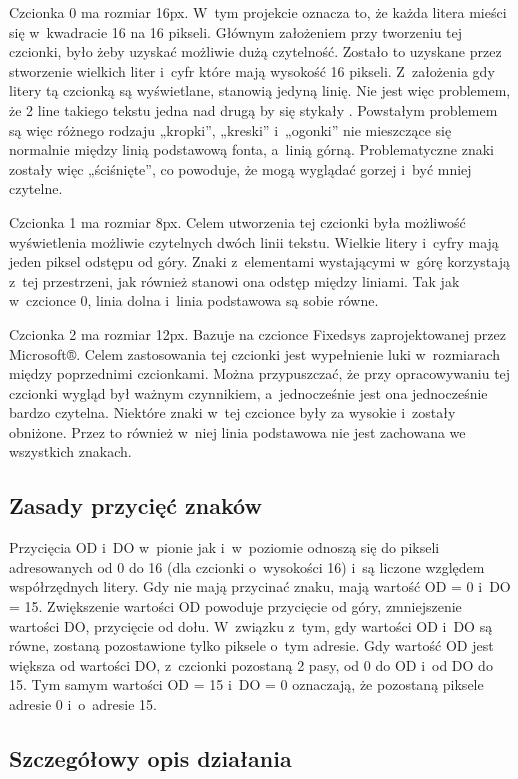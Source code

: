 Czcionka 0 ma rozmiar 16px. W~tym projekcie oznacza to, że każda litera mieści się w~kwadracie 16 na 16 pikseli. Głównym założeniem przy tworzeniu tej czcionki, było żeby uzyskać możliwie dużą czytelność. Zostało to uzyskane przez stworzenie wielkich liter i~cyfr które mają wysokość 16 pikseli. Z~założenia gdy litery tą czcionką są wyświetlane, stanowią jedyną linię. Nie jest więc problemem, że 2 line takiego tekstu jedna nad drugą by się stykały . Powstałym problemem są więc różnego rodzaju „kropki”, „kreski” i~„ogonki” nie mieszczące się normalnie między linią podstawową fonta, a~linią górną. Problematyczne znaki zostały więc „ściśnięte”, co powoduje, że mogą wyglądać gorzej i~być mniej czytelne. 

Czcionka 1 ma rozmiar 8px. Celem utworzenia tej czcionki była możliwość wyświetlenia możliwie czytelnych dwóch linii tekstu. Wielkie litery i~cyfry mają jeden piksel odstępu od góry. Znaki z~elementami wystającymi w~górę korzystają z~tej przestrzeni, jak również stanowi ona odstęp między liniami. Tak jak w~czcionce 0, linia dolna i~linia podstawowa są sobie równe.

Czcionka 2 ma rozmiar 12px. Bazuje na czcionce Fixedsys zaprojektowanej przez Microsoft®. Celem zastosowania tej czcionki jest wypełnienie luki w~rozmiarach między poprzednimi czcionkami. Można przypuszczać, że przy opracowywaniu tej czcionki wygląd był ważnym czynnikiem, a~jednocześnie jest ona jednocześnie bardzo czytelna. Niektóre znaki w~tej czcionce były za wysokie i~zostały obniżone. Przez to również w~niej linia podstawowa nie jest zachowana we wszystkich znakach.

\subsection{Zasady przycięć znaków}
Przycięcia OD i~DO w~pionie jak i~w~poziomie odnoszą się do pikseli adresowanych od 0 do 16 (dla czcionki o~wysokości 16) i~są liczone względem współrzędnych litery. Gdy nie mają przycinać znaku, mają wartość OD = 0 i~DO = 15. Zwiększenie wartości OD powoduje przycięcie od góry, zmniejszenie wartości DO, przycięcie od dołu. W~związku z~tym, gdy wartości OD i~DO są równe, zostaną pozostawione tylko piksele o~tym adresie. Gdy wartość OD jest większa od wartości DO, z~czcionki pozostaną 2 pasy, od 0 do OD i~od DO do 15. Tym samym wartości  OD = 15 i~DO = 0 oznaczają, że pozostaną piksele adresie 0 i~o~adresie 15.

\subsection{Szczegółowy opis działania}
